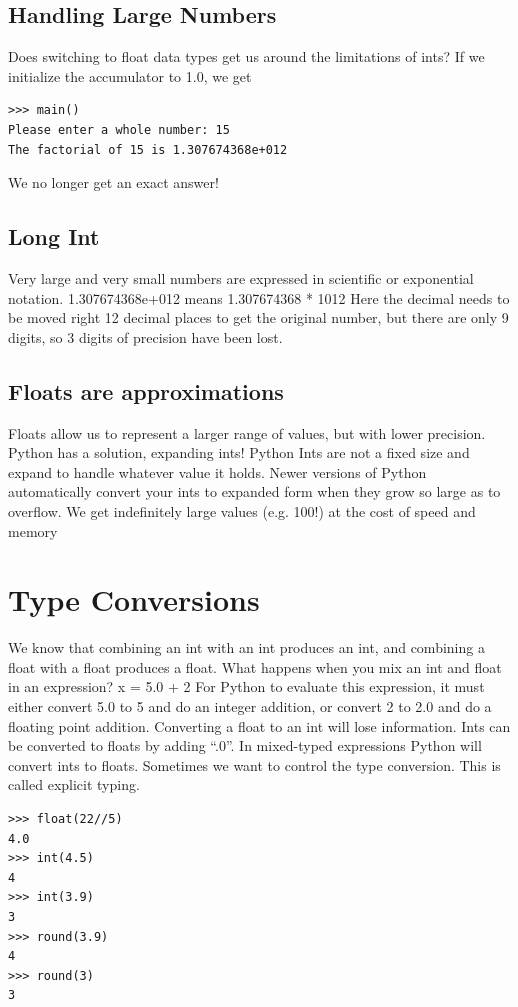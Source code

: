 \documentclass[12pt,a4paper,final,twoside,titlepage]{book}
\begin{document}
\subsection{Handling Large Numbers}
Does switching to float data types get us around the limitations of ints?
If we initialize the accumulator to 1.0, we get
\lstset{language=Python, tabsize=4}
\begin{lstlisting}
>>> main()
Please enter a whole number: 15
The factorial of 15 is 1.307674368e+012
\end{lstlisting}
We no longer get an exact answer!
\subsection{Long Int}
Very large and very small numbers are expressed in scientific or exponential notation.
1.307674368e+012 means 1.307674368 * 1012
Here the decimal needs to be moved right 12 decimal places to get the original number, but there are only 9 digits, so 3 digits of precision have been lost.
\subsection{Floats are approximations}
Floats allow us to represent a larger range of values, but with lower precision. Python has a solution, expanding ints! Python Ints are not a fixed size and expand to handle whatever value it holds. Newer versions of Python automatically convert your ints to expanded form when they grow so large as to overflow. We get indefinitely large values (e.g. 100!) at the cost of speed and memory
\section{Type Conversions}
We know that combining an int with an int produces an int, and combining a float with a float produces a float. What happens when you mix an int and float in an expression?
x = 5.0 + 2
For Python to evaluate this expression, it must either convert 5.0 to 5 and do an integer addition, or convert 2 to 2.0 and do a floating point addition. Converting a float to an int will lose information. Ints can be converted to floats by adding “.0”. In mixed-typed expressions Python will convert ints to floats. Sometimes we want to control the type conversion. This is called explicit typing.
\lstset{language=Python, tabsize=4}
\begin{lstlisting}
>>> float(22//5)
4.0
>>> int(4.5)
4
>>> int(3.9)
3
>>> round(3.9)
4
>>> round(3)
3
\end{lstlisting}
\end{document}
